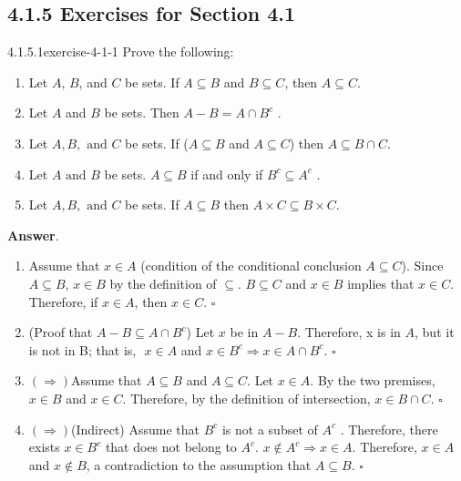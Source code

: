 \documentclass[twoside,10pt,]{book}
\numberwithin{equation}{section}
\begin{document}
\subsection*{4.1.5 Exercises for Section 4.1}
\begin{divisionsolution}{4.1.5.1}{}{exercise-4-1-1}%
\hypertarget{p-1547}{}%
Prove the following:\leavevmode%
\begin{enumerate}[label=(\alph*)]
\item\hypertarget{li-819}{}\hypertarget{p-1548}{}%
Let \(A\), \(B\), and \(C\) be sets. If \(A\subseteq B\) and \(B\subseteq C\), then \(A\subseteq C\).%
\item\hypertarget{li-820}{}\hypertarget{p-1549}{}%
Let \(A\) and \(B\) be sets. Then \(A - B= A\cap B^c\) .%
\item\hypertarget{li-821}{}\hypertarget{p-1550}{}%
Let \(A,B, \textrm{ and } C\) be sets. If (\(A\subseteq B\) and \(A\subseteq C\)) then \(A\subseteq B\cap C\).%
\item\hypertarget{li-822}{}\hypertarget{p-1551}{}%
Let \(A \textrm{ and } B\) be sets. \(A\subseteq B\) if and only if \(B^c\subseteq A^c\) .%
\item\hypertarget{li-823}{}\hypertarget{p-1552}{}%
Let \(A,B, \textrm{ and } C\) be sets. If \(A\subseteq B\) then \(A\times C \subseteq B\times C\).%
\end{enumerate}
%
\par\smallskip%
\noindent\textbf{Answer}.\quad%
\hypertarget{p-1553}{}%
\leavevmode%
\begin{enumerate}[label=(\alph*)]
\item\hypertarget{li-824}{}\hypertarget{p-1554}{}%
Assume that \(x\in A\) (condition of the conditional conclusion \(A \subseteq  C\)). Since \(A \subseteq  B\), \(x\in B\) by the definition of \(\subseteq\). \(B\subseteq C\) and \(x\in B\) implies that \(x\in C\). Therefore, if \(x\in A\), then \(x\in C\). \(\square\)%
\item\hypertarget{li-825}{}\hypertarget{p-1555}{}%
(Proof that \(A -B \subseteq A\cap B^c\)) Let \(x\) be in \(A - B\). Therefore, x is in \(A\), but it is not in B; that is,\(\text{  }x \in  A\) and      \(x \in  B^c \Rightarrow x\in A\cap B^c\). \(\square\)%
\item\hypertarget{li-826}{}\hypertarget{p-1556}{}%
\((\Rightarrow )\)Assume that \(A \subseteq  B\) and \(A \subseteq  C\). Let \(x\in A\). By the two premises,\(x\in B\) and \(x\in C\). Therefore, by the      definition of intersection, \(x\in B\cap C\). \(\square\)%
\item\hypertarget{li-827}{}\hypertarget{p-1557}{}%
\((\Rightarrow )\)(Indirect) Assume that \(B^c\) is not a subset of \(A^c\) . Therefore, there exists \(x\in B^c\) that does not  belong to \(A^c\). \(x \notin  A^c \Rightarrow  x \in  A\). Therefore, \(x\in A\) and \(x\notin B\), a contradiction to the assumption that \(A\subseteq B\). \(\square\)%
\end{enumerate}
%
\end{divisionsolution}%
\end{document}
